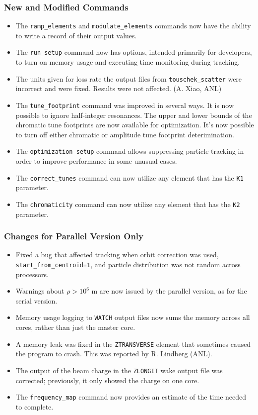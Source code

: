 \documentclass[11pt]{article}
\begin{document}
\subsubsection{New and Modified Commands}
\begin{itemize}
\item The \verb|ramp_elements| and \verb|modulate_elements| commands now have the ability to write a record of their
  output values.
\item The \verb|run_setup| command now has options, intended primarily for developers, to turn on memory usage and executing time monitoring during tracking.
\item The units given for loss rate the output files from \verb|touschek_scatter| were incorrect and were fixed. Results were not affected. (A. Xiao, ANL)
\item The \verb|tune_footprint| command was improved in several ways. It is now possible to ignore half-integer resonances.
  The upper and lower bounds of the chromatic tune footprints are now available for optimization.
  It's now possible to turn off either chromatic or amplitude tune footprint deterimination.
\item The \verb|optimization_setup| command allows suppressing particle tracking in order to improve performance in some unusual cases.
\item The \verb|correct_tunes| command can now utilize any element that has the \verb|K1| parameter.
\item The \verb|chromaticity| command can now utilize any element that has the \verb|K2| parameter.
\end{itemize}

\subsubsection{Changes for Parallel Version Only}

\begin{itemize}
\item Fixed a bug that affected tracking when orbit correction was used, \verb|start_from_centroid=1|, and particle distribution
  was not random across processors.
\item Warnings about $\rho>10^{6}$ m are now issued by the parallel version, as for the serial version.
\item Memory usage logging to \verb|WATCH| output files now sums the memory across all cores, rather than just the master core.
\item A memory leak was fixed in the \verb|ZTRANSVERSE| element that sometimes caused the program to crash. This was reported by
  R. Lindberg (ANL).
\item The output of the beam charge in the \verb|ZLONGIT| wake output file was corrected; previously, it only showed the charge on 
  one core.
\item The \verb|frequency_map| command now provides an estimate of the time needed to complete.
\end{itemize}
\end{document}
